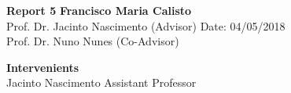 \documentclass[a4paper, 11pt]{article}
\begin{document}
\noindent
\large\textbf{Report 5} \hfill \textbf{Francisco Maria Calisto} \\
\normalsize
Prof. Dr. Jacinto Nascimento (Advisor) \hfill Date: 04/05/2018 \\
Prof. Dr. Nuno Nunes (Co-Advisor) \hfill

\hfill

\noindent
\large\textbf{Intervenients} \hfill \\
Jacinto Nascimento \hfill Assistant Professor \\






\clearpage



\end{document}
